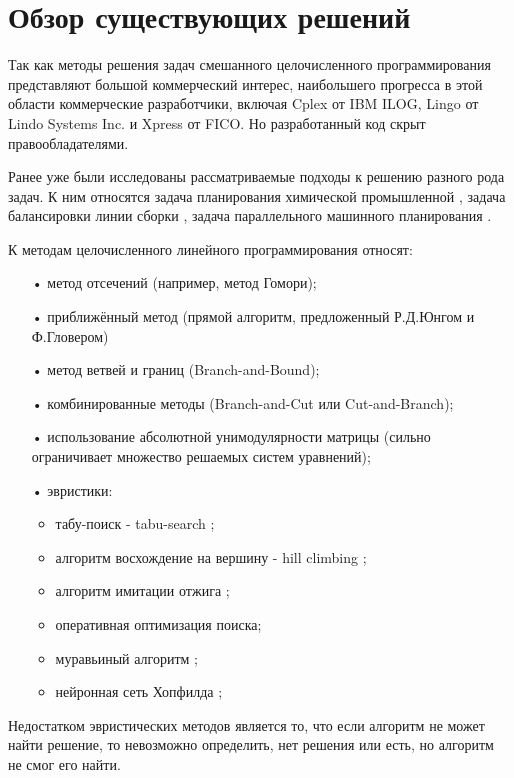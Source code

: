 \documentclass[a4paper,14pt,russian]{extreport}
\begin{document}
\section{Обзор существующих решений}

Так как методы решения задач смешанного целочисленного программирования представляют большой коммерческий интерес, наибольшего прогресса в этой области коммерческие разработчики, включая Cplex от IBM ILOG, Lingo от Lindo Systems Inc. и Xpress от FICO. Но разработанный код скрыт правообладателями. 
\par Ранее уже были исследованы рассматриваемые подходы к решению разного рода задач. К ним относятся задача планирования химической промышленной \cite{timpe}, задача балансировки линии сборки \cite{bockmayr_pisaruk}, задача параллельного машинного планирования \cite{jain_grossmann}.
\par К методам целочисленного линейного программирования относят:
  \begin{itemize}
  \item[•] метод отсечений (например, метод Гомори);
  \item[•] приближённый метод (прямой алгоритм, предложенный Р.Д.Юнгом и Ф.Гловером)
  \item[•] метод ветвей и границ (Branch-and-Bound);
  \item[•] комбинированные методы (Branch-and-Cut или Cut-and-Branch);
  \item[•] использование абсолютной унимодулярности матрицы (сильно ограничивает множество решаемых систем уравнений);
  \item[•] эвристики:
    \begin{itemize}
    \item табу-поиск - tabu-search \cite{glover};
    \item алгоритм восхождение на вершину - hill climbing \cite{russell};
    \item алгоритм имитации отжига \cite{kirkpatrick};
    \item оперативная оптимизация поиска;
    \item муравьиный алгоритм \cite{colorni};
    \item нейронная сеть Хопфилда \cite{lau};
    \end{itemize}
  \end{itemize}
\par Недостатком эвристических методов является то, что если алгоритм не может найти решение, то невозможно определить, нет решения или есть, но алгоритм не смог его найти. 
\end{document}
